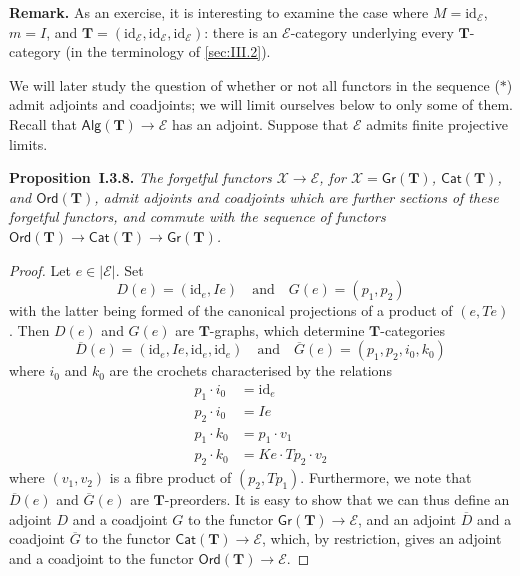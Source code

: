 \documentclass[fleqn]{article}
\newenvironment{itenv}[1]
  {\phantomsection\par\medskip\noindent\textbf{#1.}\itshape}
  {\par\medskip}
\newenvironment{rmenv}[1]
  {\phantomsection\par\medskip\noindent\textbf{#1.}\rmfamily}
  {\par\medskip}
\newcommand{\id}{\mathrm{id}}
\newcommand{\TT}{\mathbf{T}}
\newcommand{\textand}{\quad\text{and}\quad}
\newcommand{\cat}[1]{\mathcal{#1}}
\newcommand{\Cat}[1]{\mathsf{#1}}
\newcommand{\set}[1]{|#1|}
\newcommand{\Gr}[1]{\Cat{Gr}(#1)}
\newcommand{\Alg}[1]{\Cat{Alg}(#1)}
\newcommand{\Ord}[1]{\Cat{Ord}(#1)}
\begin{document}
\begin{rmenv}{Remark}
  As an exercise, it is interesting to examine the case where $M=\id_\cat{E}$, $m=I$, and $\TT=(\id_\cat{E},\id_\cat{E},\id_\cat{E})$: there is an $\cat{E}$-category underlying every $\TT$-category (in the terminology of \cref{sec:III.2}).
\end{rmenv}

We will later study the question of whether or not all functors in the sequence ($\ast$) admit adjoints and coadjoints;
we will limit ourselves below to only some of them.
Recall that $\Alg{\TT}\to\cat{E}$ has an adjoint.
Suppose that $\cat{E}$ admits finite projective limits.

\begin{itenv}{Proposition~I.3.8}
  The forgetful functors $\cat{X}\to\cat{E}$, for $\cat{X}=\Gr{\TT}$, $\Cat{Cat}(\TT)$, and $\Ord{\TT}$, admit adjoints and coadjoints which are further sections of these forgetful functors, and commute with the sequence of functors $\Ord{\TT}\to\Cat{Cat}(\TT)\to\Gr{\TT}$.
\end{itenv}

\begin{proof}
  Let $e\in\set{\cat{E}}$.
  Set
  \[
    D(e) = (\id_e,Ie)
    \textand
    G(e) = (p_1,p_2)
  \]
  with the latter being formed of the canonical projections of a product of $(e,Te)$.
  Then $D(e)$ and $G(e)$ are $\TT$-graphs, which determine $\TT$-categories
  \[
    \overline{D}(e) = (\id_e,Ie,\id_e,\id_e)
    \textand
    \overline{G}(e) = (p_1,p_2,i_0,k_0)
  \]
  where $i_0$ and $k_0$ are the crochets characterised by the relations
  \[
    \begin{aligned}
      p_1\cdot i_0
    & = \id_e
    \\p_2\cdot i_0
    & = Ie
    \\p_1\cdot k_0
    & = p_1\cdot v_1
    \\p_2\cdot k_0
    & = Ke\cdot Tp_2\cdot v_2
    \end{aligned}
  \]
  where $(v_1,v_2)$ is a fibre product of $(p_2,Tp_1)$.
  Furthermore, we note that $\overline{D}(e)$ and $\overline{G}(e)$ are $\TT$-preorders.
  It is easy to show that we can thus define an adjoint $D$ and a coadjoint $G$ to the functor $\Gr{\TT}\to\cat{E}$, and an adjoint $\overline{D}$ and a coadjoint $\overline{G}$ to the functor $\Cat{Cat}(\TT)\to\cat{E}$, which, by restriction, gives an adjoint and a coadjoint to the functor $\Ord{\TT}\to\cat{E}$.
\end{proof}
\end{document}
